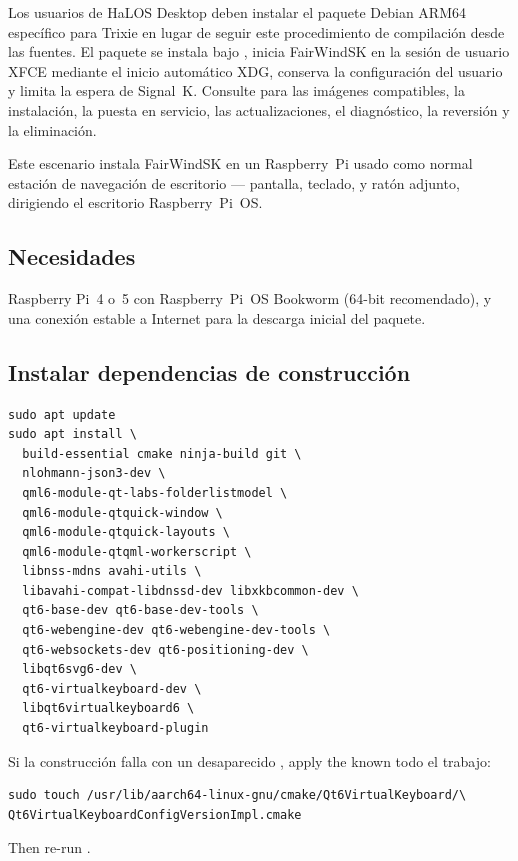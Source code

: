 Los usuarios de HaLOS Desktop deben instalar el paquete Debian ARM64 específico
para Trixie en lugar de seguir este procedimiento de compilación desde las
fuentes. El paquete se instala bajo , inicia FairWindSK en la sesión
de usuario XFCE mediante el inicio automático XDG, conserva la configuración
del usuario y limita la espera de Signal~K. Consulte  para
las imágenes compatibles, la instalación, la puesta en servicio, las
actualizaciones, el diagnóstico, la reversión y la eliminación.

Este escenario instala FairWindSK en un Raspberry~Pi usado como normal
estación de navegación de escritorio --- pantalla, teclado, y ratón adjunto,
dirigiendo el escritorio Raspberry~Pi~OS.

\subsection{Necesidades}

Raspberry Pi~4 o~5 con Raspberry~Pi~OS Bookworm (64-bit recomendado),
y una conexión estable a Internet para la descarga inicial del paquete.

\subsection{Instalar dependencias de construcción}

\begin{lstlisting}
sudo apt update
sudo apt install \
  build-essential cmake ninja-build git \
  nlohmann-json3-dev \
  qml6-module-qt-labs-folderlistmodel \
  qml6-module-qtquick-window \
  qml6-module-qtquick-layouts \
  qml6-module-qtqml-workerscript \
  libnss-mdns avahi-utils \
  libavahi-compat-libdnssd-dev libxkbcommon-dev \
  qt6-base-dev qt6-base-dev-tools \
  qt6-webengine-dev qt6-webengine-dev-tools \
  qt6-websockets-dev qt6-positioning-dev \
  libqt6svg6-dev \
  qt6-virtualkeyboard-dev \
  libqt6virtualkeyboard6 \
  qt6-virtualkeyboard-plugin
\end{lstlisting}

\begin{notebox}
Si la construcción falla con un desaparecido
, apply the known
todo el trabajo:
\begin{lstlisting}
sudo touch /usr/lib/aarch64-linux-gnu/cmake/Qt6VirtualKeyboard/\
Qt6VirtualKeyboardConfigVersionImpl.cmake
\end{lstlisting}
Then re-run \code{cmake}.
\end{notebox}

